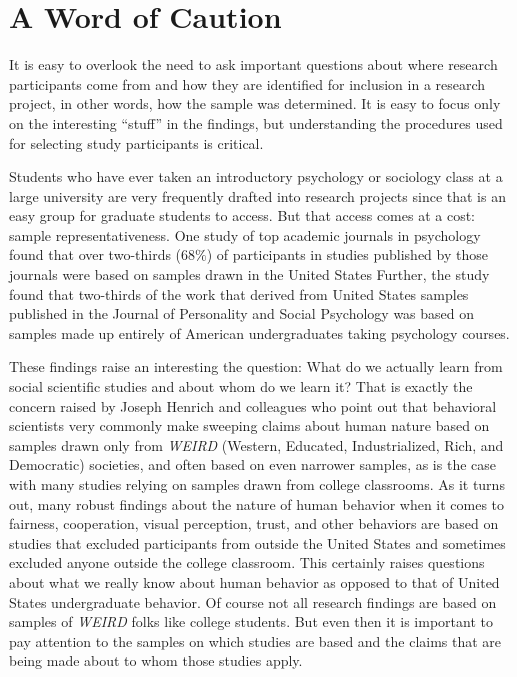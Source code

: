 \section{A Word of Caution}

It is easy to overlook the need to ask important questions about where research participants come from and how they are identified for inclusion in a research project, in other words, how the sample was determined. It is easy to focus only on the interesting ``stuff'' in the findings, but understanding the procedures used for selecting study participants is critical.

Students who have ever taken an introductory psychology or sociology class at a large university are very frequently drafted into research projects since that is an easy group for graduate students to access. But that access comes at a cost: sample representativeness. One study of top academic journals in psychology found that over two-thirds ($ 68\% $) of participants in studies published by those journals were based on samples drawn in the United States\cite{arnett2008neglected} Further, the study found that two-thirds of the work that derived from United States samples published in the Journal of Personality and Social Psychology was based on samples made up entirely of American undergraduates taking psychology courses.

These findings raise an interesting the question: What do we actually learn from social scientific studies and about whom do we learn it? That is exactly the concern raised by Joseph Henrich and colleagues\cite{henrich2010most} who point out that behavioral scientists very commonly make sweeping claims about human nature based on samples drawn only from \textit{WEIRD} (Western, Educated, Industrialized, Rich, and Democratic) societies, and often based on even narrower samples, as is the case with many studies relying on samples drawn from college classrooms. As it turns out, many robust findings about the nature of human behavior when it comes to fairness, cooperation, visual perception, trust, and other behaviors are based on studies that excluded participants from outside the United States and sometimes excluded anyone outside the college classroom. This certainly raises questions about what we really know about human behavior as opposed to that of United States undergraduate behavior. Of course not all research findings are based on samples of \textit{WEIRD} folks like college students. But even then it is important to pay attention to the samples on which studies are based and the claims that are being made about to whom those studies apply.

